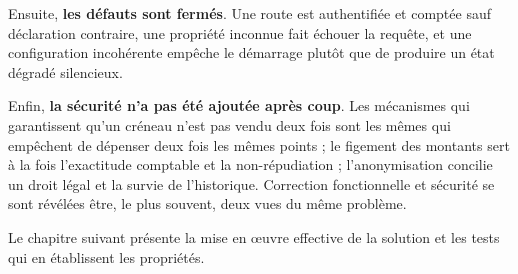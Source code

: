 Ensuite, \textbf{les défauts sont fermés}. Une route est authentifiée et
comptée sauf déclaration contraire, une propriété inconnue fait échouer la
requête, et une configuration incohérente empêche le démarrage plutôt que de
produire un état dégradé silencieux.

Enfin, \textbf{la sécurité n'a pas été ajoutée après coup}. Les mécanismes qui
garantissent qu'un créneau n'est pas vendu deux fois sont les mêmes qui
empêchent de dépenser deux fois les mêmes points ; le figement des montants
sert à la fois l'exactitude comptable et la non-répudiation ; l'anonymisation
concilie un droit légal et la survie de l'historique. Correction fonctionnelle
et sécurité se sont révélées être, le plus souvent, deux vues du même
problème.

Le chapitre suivant présente la mise en \oe uvre effective de la solution et
les tests qui en établissent les propriétés.
